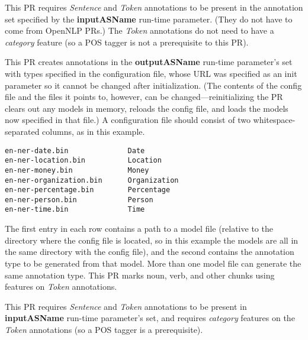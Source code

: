 This PR requires \emph{Sentence} and \emph{Token} annotations to be present in
the annotation set specified by the \textbf{inputASName} run-time parameter.
(They do not have to come from OpenNLP PRs.)  The \emph{Token} annotations do
not need to have a \emph{category} feature (so a POS tagger is not a
prerequisite to this PR).

This PR creates annotations in the \textbf{outputASName} run-time parameter's
set with types specified in the configuration file, whose URL was specified as
an init parameter so it cannot be changed after initialization.  (The contents
of the config file and the files it points to, however, can be
changed---reinitializing the PR clears out any models in memory, reloads the
config file, and loads the models now specified in that file.)  A configuration
file should consist of two whitespace-separated columns, as in this example.
\begin{center}
\begin{verbatim}
en-ner-date.bin              Date
en-ner-location.bin          Location
en-ner-money.bin             Money
en-ner-organization.bin      Organization
en-ner-percentage.bin        Percentage
en-ner-person.bin            Person
en-ner-time.bin              Time
\end{verbatim}
\end{center}
The first entry in each row contains a path to a model file (relative to the
directory where the config file is located, so in this example the models are
all in the same directory with the config file), and the second contains the
annotation type to be generated from that model.  More than one model file can
generate the same annotation type.
This PR marks noun, verb, and other chunks using features on \emph{Token}
annotations.

This PR requires \emph{Sentence} and \emph{Token} annotations to be present in
\textbf{inputASName} run-time parameter's set, and requires \emph{category}
features on the \emph{Token} annotations (so a POS tagger is a prerequisite).

